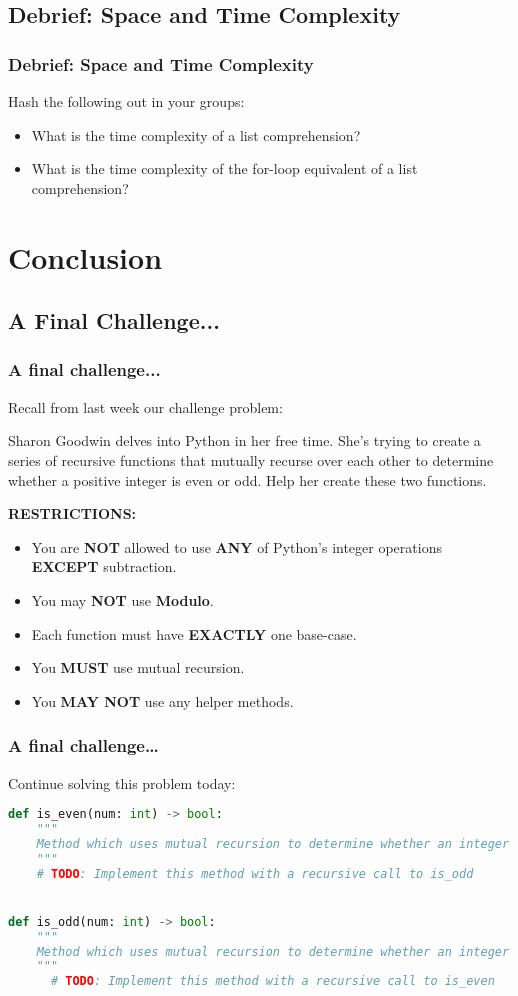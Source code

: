 \documentclass[hyperref={colorlinks,citecolor=blue,linkcolor=blue,urlcolor=blue}]{beamer}
\begin{document}
\subsection{Debrief: Space and Time Complexity}
\begin{frame}
  \frametitle{Debrief: Space and Time Complexity}
  Hash the following out in your groups:
  \begin{itemize}
    \item What is the time complexity of a list comprehension?
    \item What is the time complexity of the for-loop equivalent of a list comprehension?
\end{itemize}
\end{frame}

\section{Conclusion}
\subsection{A Final Challenge...}

\begin{frame}
  \frametitle{A final challenge...}
Recall from last week our challenge problem:

Sharon Goodwin delves into Python in her free time. She's trying to create a series of recursive functions that mutually recurse over each other to determine whether a positive integer is even or odd. Help her create these two functions.
\begin{center}
  \textbf{RESTRICTIONS:}
  \begin{itemize}
    \item You are \textbf{NOT} allowed to use \textbf{ANY} of Python's integer operations \textbf{EXCEPT} subtraction.
    \item You may \textbf{NOT} use \textbf{Modulo}.
    \item Each function must have \textbf{EXACTLY} one base-case.
    \item You \textbf{MUST} use mutual recursion.
    \item You \textbf{MAY NOT} use any helper methods.
  \end{itemize}  
\end{center}
\end{frame}
\begin{frame}[fragile]
  \frametitle{A final challenge\ldots}
  Continue solving this problem today: 
  \begin{lstlisting}[language=Python, style=mystyle]
def is_even(num: int) -> bool:
    """
    Method which uses mutual recursion to determine whether an integer is even or odd.
    """
    # TODO: Implement this method with a recursive call to is_odd


def is_odd(num: int) -> bool:
    """
    Method which uses mutual recursion to determine whether an integer is even or odd.
    """
      # TODO: Implement this method with a recursive call to is_even
    \end{lstlisting}    
\end{frame}
\end{document}
